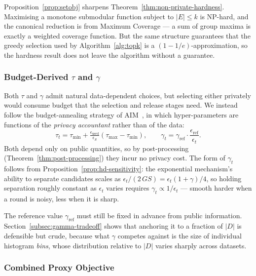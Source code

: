 Proposition~\ref{prop:setobj} sharpens Theorem~\ref{thm:non-private-hardness}.
Maximising a monotone submodular function subject to $|E|\le k$ is NP-hard, and the canonical reduction is from Maximum Coverage --- a sum of group maxima is exactly a weighted coverage function.
But the same structure guarantees that the greedy selection used by Algorithm~\ref{alg:topk} is a $(1-1/e)$-approximation, so the hardness result does not leave the algorithm without a guarantee.

\subsubsection{Budget-Derived $\tau$ and $\gamma$}
\label{subsubsec:adaptive-params}

Both $\tau$ and $\gamma$ admit natural data-dependent choices, but selecting either privately would consume budget that the selection and release stages need.
We instead follow the budget-annealing strategy of AIM~\cite{McKennaMSM22}, in which hyper-parameters are functions of the \emph{privacy accountant} rather than of the data:
\begin{equation}
\tau_t=\tau_{\min}+\tfrac{\epsilon_{\text{used}}}{\epsilon_S}\left(\tau_{\max}-\tau_{\min}\right),
\qquad
\gamma_t=\gamma_{\text{ref}}\cdot\frac{\epsilon_{\text{ref}}}{\epsilon_t}.
\label{eq:adaptive-params}
\end{equation}
Both depend only on public quantities, so by post-processing (Theorem~\ref{thm:post-processing}) they incur no privacy cost.
The form of $\gamma_t$ follows from Proposition~\ref{prop:hd-sensitivity}: the exponential mechanism's ability to separate candidates scales as $\epsilon_t/(2\,GS)=\epsilon_t(1+\gamma)/4$, so holding separation roughly constant as $\epsilon_t$ varies requires $\gamma_t\propto 1/\epsilon_t$ --- smooth harder when a round is noisy, less when it is sharp.

The reference value $\gamma_{\text{ref}}$ must still be fixed in advance from public information.
Section~\ref{subsec:gamma-tradeoff} shows that anchoring it to a fraction of $|D|$ is defensible but crude, because what $\gamma$ competes against is the size of individual histogram \emph{bins}, whose distribution relative to $|D|$ varies sharply across datasets.

\subsubsection{Combined Proxy Objective}
\label{subsubsec:combined-proxy-objective}

